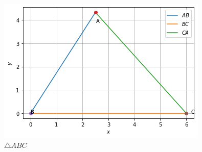 \begin{figure}[ht]
    \centering
    \includegraphics[width=\columnwidth]{solutions/8/fig-1.png}
    \caption{$\triangle ABC$}
    \label{fig:triangle ABC}
\end{figure}






